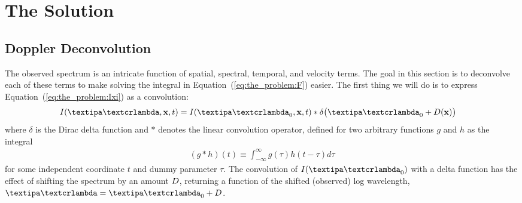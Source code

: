 \documentclass[modern]{aastex631}
\begin{document}
\section{The Solution}
\label{sec:the_solution}

\subsection{Doppler Deconvolution}

The observed spectrum is an intricate function of spatial, spectral, temporal, and velocity terms. 
The goal in this section is to deconvolve each of these terms to make solving the integral in Equation~(\ref{eq:the_problem:F}) easier.
%
The first thing we will do is to express Equation~(\ref{eq:the_problem:Ixi}) as a convolution:
%
\begin{align}
    \label{eq:deconv:convolution}
    I(\lnlam, \x, t) & =
    I(\lnlam_0, \x, t)
    *
    \delta\big(\lnlam_0 + \D(\x)\big)
\end{align}
%
where $\delta$ is the Dirac delta function and $*$ denotes the linear convolution operator, defined for two arbitrary functions $g$ and $h$ as the integral
%
\begin{align}
    \label{eq:deconv:convolution_def}
    (g * h)(t) \equiv \int_{-\infty}^\infty g(\tau) h(t - \tau) d\tau
\end{align}
%
for some independent coordinate $t$ and dummy parameter $\tau$.
%
The convolution of $I(\lnlam_0)$ with a delta function has the effect of shifting the spectrum by an amount $D$, returning a function of the shifted (observed) log wavelength, $\lnlam = \lnlam_0 + \D$.
\end{document}
